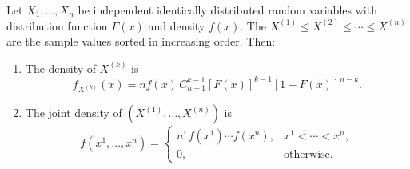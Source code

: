 Let $X_1, \ldots, X_n$ be independent identically distributed random variables with distribution function $F(x)$ and density $f(x)$. The  $X^{(1)} \leq X^{(2)} \leq \cdots \leq X^{(n)}$ are the sample values sorted in increasing order. Then:
\begin{enumerate}
\item The density of $X^{(k)}$ is
$$f_{X^{(k)}}(x) = n f(x) \, C_{n-1}^{k-1} [F(x)]^{k-1} [1 - F(x)]^{n-k}.$$
\item The joint density of $(X^{(1)}, \ldots, X^{(n)})$ is
$$f(x^1, \ldots, x^n) = \begin{cases} n! \, f(x^1) \cdots f(x^n), & x^1 < \cdots < x^n, \\ 0, & \text{otherwise}. \end{cases}$$
\end{enumerate}
